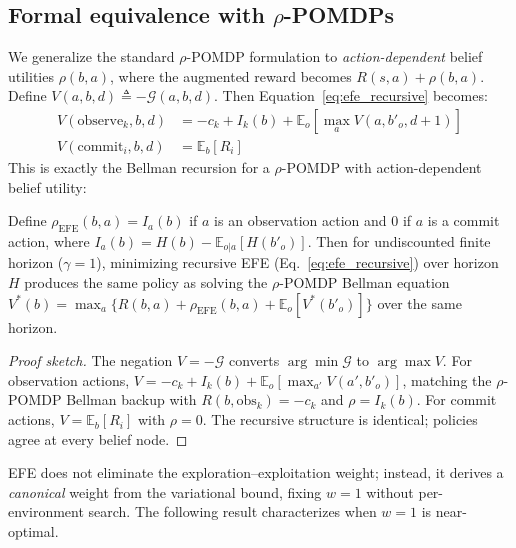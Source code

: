 \documentclass[runningheads]{llncs}
\begin{document}
\subsection{Formal equivalence with $\rho$-POMDPs}
\label{subsec:formal_rho_equiv}

We generalize the standard $\rho$-POMDP formulation to \emph{action-dependent} belief utilities $\rho(b, a)$, where the augmented reward becomes $R(s,a) + \rho(b,a)$. Define $V(a, b, d) \triangleq -\mathcal{G}(a, b, d)$. Then Equation~\ref{eq:efe_recursive} becomes:
\begin{align}
    V(\text{observe}_k, b, d) &= -c_k + I_k(b) + \mathbb{E}_o\!\left[\max_a V(a, b'_o, d{+}1)\right] \label{eq:bellman_obs} \\
    V(\text{commit}_i, b, d) &= \mathbb{E}_b[R_i] \label{eq:bellman_commit}
\end{align}
This is exactly the Bellman recursion for a $\rho$-POMDP with action-dependent belief utility:

\begin{proposition}
\label{prop:equivalence}
Define $\rho_{\mathrm{EFE}}(b, a) = I_a(b)$ if $a$ is an observation action and $0$ if $a$ is a commit action, where $I_a(b) = H(b) - \mathbb{E}_{o|a}[H(b'_o)]$. Then for undiscounted finite horizon ($\gamma{=}1$), minimizing recursive EFE (Eq.~\ref{eq:efe_recursive}) over horizon $H$ produces the same policy as solving the $\rho$-POMDP Bellman equation $V^*(b) = \max_a \{R(b,a) + \rho_{\mathrm{EFE}}(b,a) + \mathbb{E}_o[V^*(b'_o)]\}$ over the same horizon.
\end{proposition}
\begin{proof}[Proof sketch]
The negation $V = -\mathcal{G}$ converts $\arg\min \mathcal{G}$ to $\arg\max V$. For observation actions, $V = -c_k + I_k(b) + \mathbb{E}_o[\max_{a'} V(a', b'_o)]$, matching the $\rho$-POMDP Bellman backup with $R(b, \text{obs}_k) = -c_k$ and $\rho = I_k(b)$. For commit actions, $V = \mathbb{E}_b[R_i]$ with $\rho = 0$. The recursive structure is identical; policies agree at every belief node.
\end{proof}

EFE does not eliminate the exploration--exploitation weight; instead, it derives a \emph{canonical} weight from the variational bound, fixing $w{=}1$ without per-environment search. The following result characterizes when $w{=}1$ is near-optimal.
\end{document}
